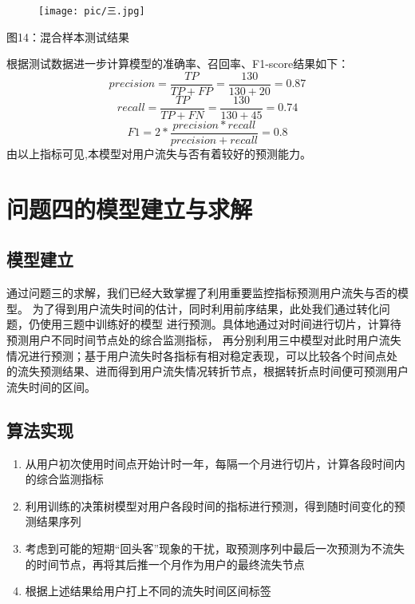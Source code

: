 \documentclass{ctexart}
\begin{document}
        \begin{center}
            \begin{figure}[H]
                \begin{center}
                    \texttt{[image: pic/三.jpg]}
                \end{center}
            \end{figure}
            图14：混合样本测试结果
        \end{center}
        
        根据测试数据进一步计算模型的准确率、召回率、F1-score结果如下：
        \begin{equation}
            precision=\frac{TP}{TP+FP}=\frac{130}{130+20}=0.87
        \end{equation}
        \begin{equation}
            recall=\frac{TP}{TP+FN}=\frac{130}{130+45}=0.74
        \end{equation}
        \begin{equation}
            F1=2*\frac{precision*recall}{precision+recall}=0.8
        \end{equation}
        由以上指标可见,本模型对用户流失与否有着较好的预测能力。

\section{问题四的模型建立与求解}
        \subsection{模型建立}
        通过问题三的求解，我们已经大致掌握了利用重要监控指标预测用户流失与否的模型。
        为了得到用户流失时间的估计，同时利用前序结果，此处我们通过转化问题，仍使用三题中训练好的模型
        进行预测。具体地通过对时间进行切片，计算待预测用户不同时间节点处的综合监测指标，
        再分别利用三中模型对此时用户流失情况进行预测；基于用户流失时各指标有相对稳定表现，可以比较各个时间点处
        的流失预测结果、进而得到用户流失情况转折节点，根据转折点时间便可预测用户流失时间的区间。
        \subsection{算法实现}
        \begin{enumerate}
            \item 从用户初次使用时间点开始计时一年，每隔一个月进行切片，计算各段时间内的综合监测指标
            \item 利用训练的决策树模型对用户各段时间的指标进行预测，得到随时间变化的预测结果序列
            \item 考虑到可能的短期“回头客”现象的干扰，取预测序列中最后一次预测为不流失的时间节点，再将其后推一个月作为用户的最终流失节点
            \item 根据上述结果给用户打上不同的流失时间区间标签
        \end{enumerate}
\end{document}
